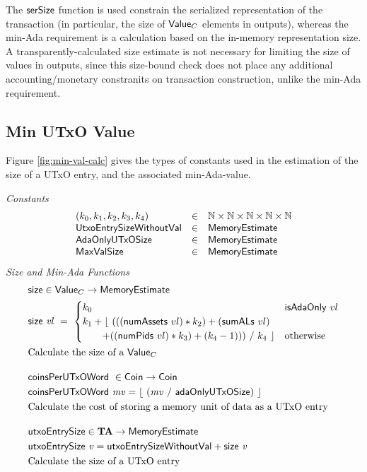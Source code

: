     The $\mathsf{serSize}$ function is used constrain
    the serialized representation of the transaction (in particular, the size
    of $\mathsf{Value}_C$ elements in outputs), whereas the min-Ada requirement is a calculation based on
    the in-memory representation size. A transparently-calculated size estimate
    is not necessary for limiting the size of values in outputs, since this size-bound
    check does not place any additional accounting/monetary constranits on transaction construction,
    unlike the min-Ada requirement.

\subsection{Min UTxO Value}
\label{sec:min-value}

Figure \ref{fig:min-val-calc} gives the types of constants used in the estimation
of the size of a UTxO entry, and the associated min-Ada-value.

\begin{figure*}[h]
  \emph{Constants}
  \begin{equation*}
    \begin{array}{lcl}
      (k_0, k_1, k_2, k_3, k_4) & \in & \mathbb{N} \times \mathbb{N} \times \mathbb{N} \times \mathbb{N} \times \mathbb{N} \\
      \mathsf{UtxoEntrySizeWithoutVal} & \in & \mathsf{MemoryEstimate} \\
      \mathsf{AdaOnlyUTxOSize} & \in & \mathsf{MemoryEstimate} \\
      \mathsf{MaxValSize} & \in & \mathsf{MemoryEstimate} \\
    \end{array}
  \end{equation*}
  \emph{Size and Min-Ada Functions}
  \begin{align*}
    & \fun{size} \in \Value_C \to \MemoryEstimate \\
    & \fun{size}~\var{vl} ~=~
    \begin{cases}
      k_0 & \fun{isAdaOnly}~vl\\
      k_1 + \lfloor~ (((\fun{numAssets}~vl) * k_2) + (\fun{sumALs}~vl) & \\
      ~~~~~~ + ((\fun{numPids}~vl) * k_3) + (k_4 - 1)))~ /~ k_4~\rfloor & \text{otherwise} \\
    \end{cases} \\
    & \text{Calculate the size of a $\Value_C$}
    \nextdef
    & \fun{coinsPerUTxOWord}~\in \Coin \to \Coin \\
    & \fun{coinsPerUTxOWord}~\var{mv} = \lfloor~ (\var{mv}~/~ \mathsf{adaOnlyUTxOSize})~ \rfloor \\
    & \text{Calculate the cost of storing a memory unit of data as a UTxO entry}
    \nextdef
    & \fun{utxoEntrySize} \in \ValMonoid \to \MemoryEstimate \\
    & \fun{utxoEntrySize}~\var{v} = \mathsf{utxoEntrySizeWithoutVal} + \fun{size}~\var{v} \\
    & \text{Calculate the size of a UTxO entry}
\end{align*}
\caption{Value Size Calculation}
\label{fig:min-val-calc}
\end{figure*}

